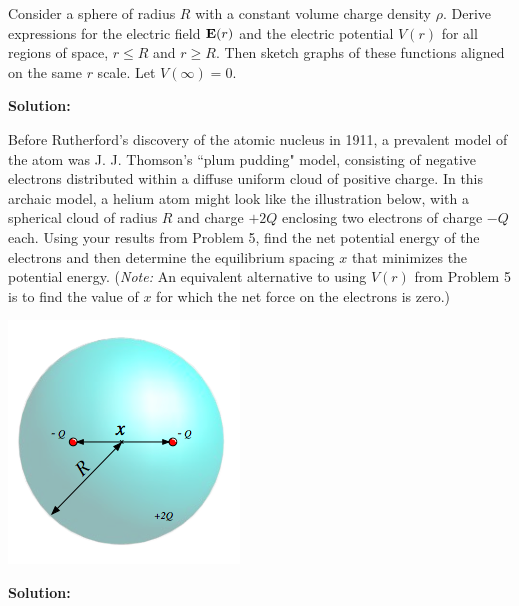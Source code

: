 \documentclass[11pt]{article}
\begin{document}

\clearpage

\begin{problem}[(\P 5.)]
Consider a sphere of radius $R$ with a constant volume charge density $\rho$. Derive expressions for the electric field $\mathbf{E}(r)$ and the electric potential
$V(r)$ for all regions of space, $r\leq R$ and $r\geq R$. Then sketch graphs of these functions aligned on the same $r$ scale. Let $V(\infty)=0$.
\end{problem}


\textbf{Solution:}


\clearpage

\begin{problem}[6.]
Before Rutherford's discovery of the atomic nucleus in
1911, a prevalent model of the atom was J. J. Thomson's
``plum pudding" model, consisting of negative electrons
distributed within a diffuse uniform cloud of positive
charge. In this archaic model, a helium atom might look
like the illustration below, with a spherical cloud of radius $R$
and charge $+2Q$ enclosing two electrons of charge $-Q$
each. Using your results from Problem 5, find the net
potential energy of the electrons and then determine the
equilibrium spacing $x$ that minimizes the potential
energy. (\textit{Note:} An equivalent alternative to using $V(r)$
from Problem 5 is to find the value of $x$ for which the net
force on the electrons is zero.)
\begin{center}
\includegraphics[scale=0.5]{prob6.png}
\end{center}
\end{problem}


\textbf{Solution:}


\clearpage
\end{document}
